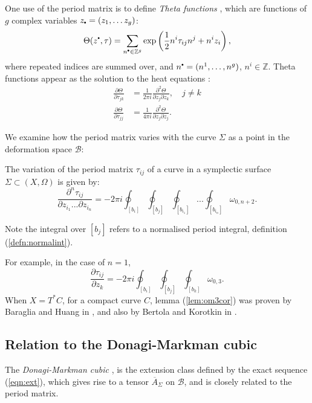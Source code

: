     \begin{ex}
    One use of the period matrix is to define \emph{Theta functions} \cite{fay,bertola}, which are functions of \(g\) complex variables \(z_{\sbt} = (z_1, \dots z_g)\):
     \[ \Theta(z^{\sbt},\tau) = \sum_{n^{\sbt} \in \mathbb{Z}^g} \exp \left( \frac{1}{2} n^i \tau_{ij} n^j + n^i z_i \right),\]
    where repeated indices are summed over, and \( n^{\sbt} = (n^1, \dots , n^g)\), \( n^i \in \mathbb{Z}\). Theta functions appear as the solution to the heat equations \cite{bertola}:
    \begin{align*}
        \frac{\partial \Theta}{\partial \tau_{jk}} &= \frac{1}{2 \pi i } \frac{\partial^2 \Theta}{\partial z_j \partial z_k}, \quad j \neq k \\
        \frac{\partial \Theta}{\partial \tau_{jj}} &= \frac{1}{4 \pi i } \frac{\partial^2 \Theta}{\partial z_j \partial z_j}.
    \end{align*}
    \end{ex}

    We examine how the period matrix varies with the curve \(\Sigma\) as a point in the deformation space \( \mathcal{B}\):
    \begin{lem} 
    \label{lem:om3cor}
    The variation of the period matrix \(\tau_{ij}\) of a curve in a symplectic surface \(\Sigma\subset (X,\Omega)\) is given by:
    \[\frac{\partial^n\tau_{ij}}{\partial z_{i_1}...\partial z_{i_n}}=-2\pi i \oint_{[b_i]}\oint_{[b_j]}\oint_{[b_{i_1}] }...\oint_{[b_{i_n}]}\omega_{0,n+2}.\] 
    \end{lem}
    Note the integral over \([b_j]\) refers to a normalised period integral, definition (\ref{defn:normalint}).
    
    For example, in the case of \(n=1\), 
    \[ \frac{\partial\tau_{ij}}{\partial z_k}= -2\pi i \oint_{[b_i]}\oint_{[b_j]}\oint_{[b_k]}\omega_{0,3}.\]
    When \(X=T^*C\), for a compact curve \(C\), lemma (\ref{lem:om3cor}) was proven by Baraglia and Huang in \cite{bhuespe}, and also by Bertola and Korotkin in \cite{bkospa}. 

    \subsection{Relation to the Donagi-Markman cubic}
    
    The \emph{Donagi-Markman cubic} \cite{domacubic}, is the extension class defined by the exact sequence (\ref{eqn:ext}), which gives rise to a tensor \( \overline{A}_\Sigma\) on \(\mathcal{B}\), and is closely related to the period matrix.
    
